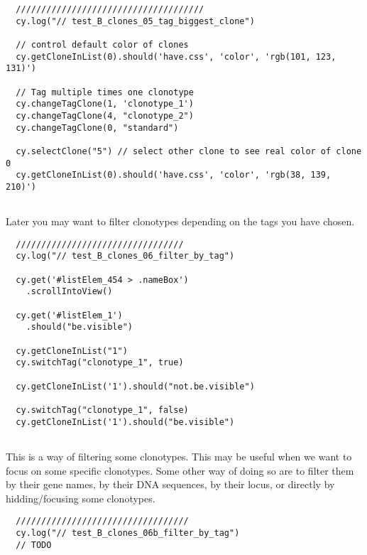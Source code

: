 \begin{verbatim}
  /////////////////////////////////////
  cy.log("// test_B_clones_05_tag_biggest_clone")

  // control default color of clones
  cy.getCloneInList(0).should('have.css', 'color', 'rgb(101, 123, 131)')

  // Tag multiple times one clonotype
  cy.changeTagClone(1, 'clonotype_1')
  cy.changeTagClone(4, "clonotype_2")
  cy.changeTagClone(0, "standard")

  cy.selectClone("5") // select other clone to see real color of clone 0
  cy.getCloneInList(0).should('have.css', 'color', 'rgb(38, 139, 210)')


\end{verbatim}

Later you may want to filter clonotypes depending on the tags you have chosen.


\begin{verbatim}
  /////////////////////////////////
  cy.log("// test_B_clones_06_filter_by_tag")

  cy.get('#listElem_454 > .nameBox')
    .scrollIntoView()

  cy.get('#listElem_1')
    .should("be.visible")

  cy.getCloneInList("1")
  cy.switchTag("clonotype_1", true)

  cy.getCloneInList('1').should("not.be.visible")

  cy.switchTag("clonotype_1", false)
  cy.getCloneInList('1').should("be.visible")


\end{verbatim}

This is a way of filtering some clonotypes. This may be useful when we want to
focus on some specific clonotypes. Some other way of doing so are to filter them by
their gene names, by their DNA sequences, 
by their locus,
or directly by hidding/focusing some clonotypes.


\begin{verbatim}
  //////////////////////////////////
  cy.log("// test_B_clones_06b_filter_by_tag")
  // TODO

\end{verbatim}

